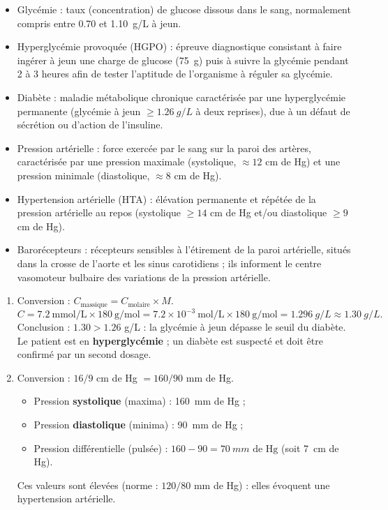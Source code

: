 \documentclass[11pt]{article}
\newcommand{\cle}[1]{{\popxbold\color{popdark}#1}}
\begin{document}
\begin{corrige}
\begin{itemize}
\item \cle{Glycémie} : taux (concentration) de glucose dissous dans le sang, normalement compris entre \num{0,70} et \SI{1,10}{g/L} à jeun.
\item \cle{Hyperglycémie provoquée} (HGPO) : épreuve diagnostique consistant à faire ingérer à jeun une charge de glucose (\SI{75}{g}) puis à suivre la glycémie pendant 2 à 3 heures afin de tester l'aptitude de l'organisme à réguler sa glycémie.
\item \cle{Diabète} : maladie métabolique chronique caractérisée par une hyperglycémie permanente (glycémie à jeun $\geq \SI{1,26}{g/L}$ à deux reprises), due à un défaut de sécrétion ou d'action de l'insuline.
\item \cle{Pression artérielle} : force exercée par le sang sur la paroi des artères, caractérisée par une pression maximale (systolique, $\approx 12$ cm de Hg) et une pression minimale (diastolique, $\approx 8$ cm de Hg).
\item \cle{Hypertension artérielle} (HTA) : élévation permanente et répétée de la pression artérielle au repos (systolique $\geq 14$ cm de Hg et/ou diastolique $\geq 9$ cm de Hg).
\item \cle{Barorécepteurs} : récepteurs sensibles à l'étirement de la paroi artérielle, situés dans la crosse de l'aorte et les sinus carotidiens ; ils informent le centre vasomoteur bulbaire des variations de la pression artérielle.
\end{itemize}
\end{corrige}

\begin{corrige}
\begin{enumerate}
\item Conversion : $C_{\text{massique}} = C_{\text{molaire}} \times M$.
\[ C = \num{7,2}\ \text{mmol/L} \times 180\ \text{g/mol} = \num{7,2}\times 10^{-3}\ \text{mol/L} \times 180\ \text{g/mol} = \SI{1,296}{g/L} \approx \SI{1,30}{g/L}. \]
Conclusion : $\num{1,30} > \num{1,26}$ g/L : la glycémie à jeun dépasse le seuil du diabète. Le patient est en \textbf{hyperglycémie} ; un diabète est suspecté et doit être confirmé par un second dosage.
\item Conversion : $16/9$ cm de Hg $= 160/90$ mm de Hg.
\begin{itemize}
\item Pression \textbf{systolique} (maxima) : \SI{160}{mm} de Hg ;
\item Pression \textbf{diastolique} (minima) : \SI{90}{mm} de Hg ;
\item Pression différentielle (pulsée) : $160 - 90 = \SI{70}{mm} \text{ de Hg}$ (soit \SI{7}{cm} de Hg).
\end{itemize}
Ces valeurs sont élevées (norme : $120/80$ mm de Hg) : elles évoquent une hypertension artérielle.
\end{enumerate}
\end{corrige}
\end{document}

